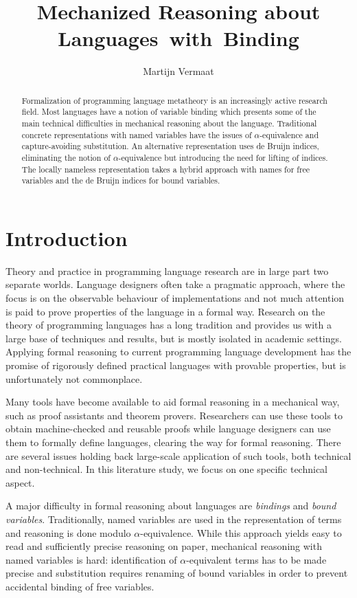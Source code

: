 \documentclass[a4paper,11pt]{article}
\title{Mechanized Reasoning about Languages~with~Binding}
\author{Martijn Vermaat}
\date{}
\begin{document}
\maketitle


\begin{abstract}
Formalization of programming language metatheory is an increasingly
active research field. Most languages have a notion of variable
binding which presents some of the main technical difficulties in
mechanical reasoning about the language. Traditional concrete
representations with named variables have the issues of
$\alpha$-equivalence and capture-avoiding substitution. An alternative
representation uses de Bruijn indices, eliminating the notion of
$\alpha$-equivalence but introducing the need for lifting of indices.
The locally nameless representation takes a hybrid approach with names
for free variables and the de Bruijn indices for bound variables.
\end{abstract}


\section{Introduction}\label{sec:introduction}

Theory and practice in programming language research are in large part
two separate worlds.
Language designers often take a pragmatic approach, where the focus is
on the observable behaviour of implementations and not much attention
is paid to prove properties of the language in a formal way.
Research on the theory of programming languages has a long tradition and
provides us with a large base of techniques and results, but is mostly
isolated in academic settings.
Applying formal reasoning to current programming language development
has the promise of rigorously defined practical languages with provable
properties, but is unfortunately not commonplace.

Many tools have become available to aid formal reasoning in a mechanical
way, such as proof assistants and theorem provers.
Researchers can use these tools to obtain machine-checked and reusable
proofs while language designers can use them to formally define languages,
clearing the way for formal reasoning.
There are several issues holding back large-scale application of such
tools, both technical and non-technical. In this literature study, we
focus on one specific technical aspect.

A major difficulty in formal reasoning about languages are {\em bindings}
and {\em bound variables}.
Traditionally, named variables are used in the representation of terms
and reasoning is done modulo $\alpha$-equivalence.
While this approach yields easy to read and sufficiently precise
reasoning on paper,
mechanical reasoning with named variables is hard:
identification of $\alpha$-equivalent terms has to be made precise and
substitution requires renaming of bound variables in order to prevent
accidental binding of free variables.
\end{document}
